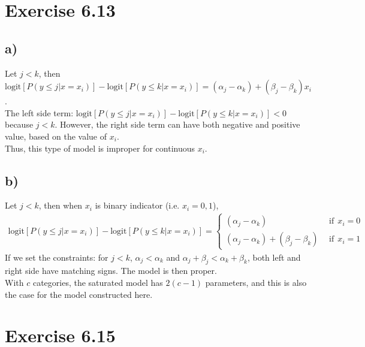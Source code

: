 \documentclass[a4paper]{article}
\begin{document}
\vspace{\baselineskip}
\section{Exercise 6.13}
\subsection{a)}
Let $j < k$, then $\mathrm{logit}\left[P(y\leq j|x=x_{i})\right] - \mathrm{logit}\left[P(y\leq k|x=x_{i})\right] = (\alpha_{j} - \alpha_{k}) + (\beta_{j} - \beta_{k})x_{i}$.\\
The left side term: $\mathrm{logit}\left[P(y\leq j|x=x_{i})\right] - \mathrm{logit}\left[P(y\leq k|x=x_{i})\right] < 0$ because $j < k$. However, the right side term can have both negative and positive value, based on the value of $x_{i}$.\\
Thus, this type of model is improper for continuous $x_{i}$.

\vspace{\baselineskip}
\subsection{b)}
Let $j < k$, then when $x_{i}$ is binary indicator (i.e. $x_{i} = 0, 1$),
\begin{align*}
\mathrm{logit}\left[P(y\leq j|x=x_{i})\right] - \mathrm{logit}\left[P(y\leq k|x=x_{i})\right] =
\begin{cases}
(\alpha_{j} - \alpha_{k}) ~~&\mbox{if}~~ x_{i} = 0\\
(\alpha_{j} - \alpha_{k}) + (\beta_{j} - \beta_{k}) ~~&\mbox{if}~~ x_{i} = 1
\end{cases}
\end{align*}
If we set the constraints: for $j < k$, $\alpha_{j} < \alpha_{k}$ and $\alpha_{j} + \beta_{j} < \alpha_{k} + \beta_{k}$, both left and right side have matching signs. The model is then proper.\\

With $c$ categories, the saturated model has $2(c-1)$ parameters, and this is also the case for the model constructed here.


\vspace{\baselineskip}
\section{Exercise 6.15}
\end{document}
